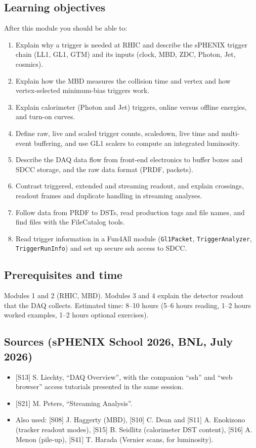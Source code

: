 \documentclass[11pt,letterpaper]{article}
\newcommand{\code}[1]{\texttt{#1}}
\begin{document}
\subsection*{Learning objectives}
After this module you should be able to:
\begin{enumerate}[label=O\arabic*.]
\item Explain why a trigger is needed at RHIC and describe the sPHENIX trigger chain (LL1, GL1, GTM) and its inputs (clock, MBD, ZDC, Photon, Jet, cosmics).
\item Explain how the MBD measures the collision time and vertex and how vertex-selected minimum-bias triggers work.
\item Explain calorimeter (Photon and Jet) triggers, online versus offline energies, and turn-on curves.
\item Define raw, live and scaled trigger counts, scaledown, live time and multi-event buffering, and use GL1 scalers to compute an integrated luminosity.
\item Describe the DAQ data flow from front-end electronics to buffer boxes and SDCC storage, and the raw data format (PRDF, packets).
\item Contrast triggered, extended and streaming readout, and explain crossings, readout frames and duplicate handling in streaming analyses.
\item Follow data from PRDF to DSTs, read production tags and file names, and find files with the FileCatalog tools.
\item Read trigger information in a Fun4All module (\code{Gl1Packet}, \code{TriggerAnalyzer}, \code{TriggerRunInfo}) and set up secure ssh access to SDCC.
\end{enumerate}

\subsection*{Prerequisites and time}
Modules 1 and 2 (RHIC, MBD). Modules 3 and 4 explain the detector readout that the DAQ collects.
Estimated time: 8--10 hours (5--6 hours reading, 1--2 hours worked examples, 1--2 hours optional exercises).

\subsection*{Sources (sPHENIX School 2026, BNL, July 2026)}
\begin{itemize}
\item {[S13]} S. Liechty, ``DAQ Overview'', with the companion ``ssh'' and ``web browser'' access tutorials presented in the same session.
\item {[S21]} M. Peters, ``Streaming Analysis''.
\item Also used: [S08] J. Haggerty (MBD), [S10] C. Dean and [S11] A. Enokizono (tracker readout modes), [S15] B. Seidlitz (calorimeter DST content), [S16] A. Menon (pile-up), [S41] T. Harada (Vernier scans, for luminosity).
\end{itemize}
\end{document}
